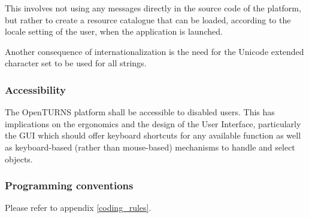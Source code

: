 This involves not using any messages directly in the source code of the platform, but rather to create a resource catalogue that can be loaded, according to the locale setting of the user, when the application is launched.

Another consequence of internationalization is the need for the Unicode extended character set to be used for all strings.

\subsubsection{Accessibility}

The OpenTURNS platform shall be accessible to disabled users. This has implications on the ergonomics and the design of the User Interface, particularly the GUI which should offer keyboard shortcuts for any available function as well as keyboard-based (rather than mouse-based) mechanisms to handle and select objects.


\subsubsection{Programming conventions}

Please refer to appendix \ref{coding_rules}.
